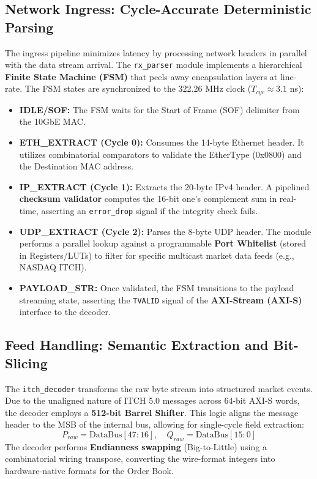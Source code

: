 \subsection{Network Ingress: Cycle-Accurate Deterministic Parsing}
The ingress pipeline minimizes latency by processing network headers in parallel with the data stream arrival. The \texttt{rx\_parser} module implements a hierarchical \textbf{Finite State Machine (FSM)} that peels away encapsulation layers at line-rate. The FSM states are synchronized to the 322.26 MHz clock ($T_{cyc} \approx 3.1$ ns):
\begin{itemize}
    \item \textbf{IDLE/SOF:} The FSM waits for the Start of Frame (SOF) delimiter from the 10GbE MAC.
    \item \textbf{ETH\_EXTRACT (Cycle 0):} Consumes the 14-byte Ethernet header. It utilizes combinatorial comparators to validate the EtherType (0x0800) and the Destination MAC address.
    \item \textbf{IP\_EXTRACT (Cycle 1):} Extracts the 20-byte IPv4 header. A pipelined \textbf{checksum validator} computes the 16-bit one's complement sum in real-time, asserting an \texttt{error\_drop} signal if the integrity check fails.
    \item \textbf{UDP\_EXTRACT (Cycle 2):} Parses the 8-byte UDP header. The module performs a parallel lookup against a programmable \textbf{Port Whitelist} (stored in Registers/LUTs) to filter for specific multicast market data feeds (e.g., NASDAQ ITCH). \datamethodology
    \item \textbf{PAYLOAD\_STR:} Once validated, the FSM transitions to the payload streaming state, asserting the \texttt{TVALID} signal of the \textbf{AXI-Stream (AXI-S)} interface to the decoder.
\end{itemize}

\subsection{Feed Handling: Semantic Extraction and Bit-Slicing}
The \texttt{itch\_decoder} transforms the raw byte stream into structured market events. Due to the unaligned nature of ITCH 5.0 messages across 64-bit AXI-S words, the decoder employs a \textbf{512-bit Barrel Shifter}. This logic aligns the message header to the MSB of the internal bus, allowing for single-cycle field extraction:
\begin{equation}
    P_{raw} = \text{DataBus}[47:16], \quad Q_{raw} = \text{DataBus}[15:0]
\end{equation}
The decoder performs \textbf{Endianness swapping} (Big-to-Little) using a combinatorial wiring transpose, converting the wire-format integers into hardware-native formats for the Order Book.

